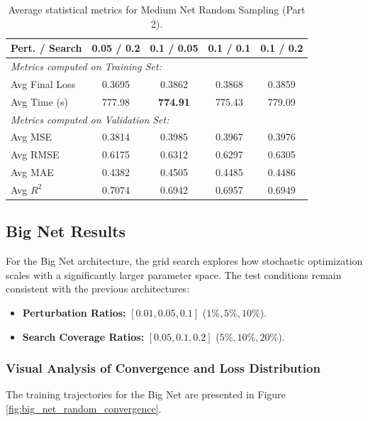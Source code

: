 \begin{table}[h]
\centering
\scriptsize
\begin{tabular}{|l|c|c|c|c|}
\hline
\textbf{Pert. / Search} & \textbf{0.05 / 0.2} & \textbf{0.1 / 0.05} & \textbf{0.1 / 0.1} & \textbf{0.1 / 0.2} \\ \hline
\multicolumn{5}{|l|}{\textit{Metrics computed on Training Set:}} \\ \hline
Avg Final Loss & 0.3695 & 0.3862 & 0.3868 & 0.3859 \\ \hline
Avg Time (s)   & 777.98 & \textbf{774.91} & 775.43 & 779.09 \\ \hline
\multicolumn{5}{|l|}{\textit{Metrics computed on Validation Set:}} \\ \hline
Avg MSE        & 0.3814 & 0.3985 & 0.3967 & 0.3976 \\ \hline
Avg RMSE       & 0.6175 & 0.6312 & 0.6297 & 0.6305 \\ \hline
Avg MAE        & 0.4382 & 0.4505 & 0.4485 & 0.4486 \\ \hline
Avg $R^2$      & 0.7074 & 0.6942 & 0.6957 & 0.6949 \\ \hline
\end{tabular}
\caption{Average statistical metrics for Medium Net Random Sampling (Part 2).}
\label{tab:medium_net_random_part2}
\end{table}

\newpage

\subsection{Big Net Results}

For the Big Net architecture, the grid search explores how stochastic optimization scales with a significantly larger parameter space. The test conditions remain consistent with the previous architectures:
\begin{itemize}
    \item \textbf{Perturbation Ratios:} $[0.01, 0.05, 0.1]$ ($1\%, 5\%, 10\%$).
    \item \textbf{Search Coverage Ratios:} $[0.05, 0.1, 0.2]$ ($5\%, 10\%, 20\%$).
\end{itemize}

\subsubsection{Visual Analysis of Convergence and Loss Distribution}

The training trajectories for the Big Net are presented in Figure \ref{fig:big_net_random_convergence}. 

